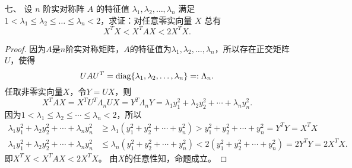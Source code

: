 \begin{enumerate}[1~]
(2) 判断命题 “若$V _ { 1 } \cap V _ { 2 } = \{ 0 \} , V _ { 3 } \cap \left( V _ { 1 } + V _ { 2 } \right) = \{ 0 \}$，则 $V _ { 1 } + V _ { 2 } + V _ { 3 }$ 为直和 ”是否正确，若正确给出证明，若不正确举出反例。

\begin{proof}
(1) 错误。反例： $V_1 = \{\boldsymbol{e}_1\}$，$V_2 = \{\boldsymbol{e}_2\}$，$V_3 = \{\boldsymbol{e}_1 + \boldsymbol{e}_2\}$，其中 $\boldsymbol{e}_1$，$\boldsymbol{e}_2$ 是 $\mathbb{R}^n$ 的两个线性无关的单位向量。

(2) 正确。设 $\Omega_1$ 是生成 $V_1$ 的向量的集合，$\Omega_2$ 是生成 $V_2$ 的向量的集合，$\Omega_3$ 是生成 $V_1$ 的向量的集合。因为 $V _ { 1 } \cap V _ { 2 } = \{ 0 \}$，所以 $V_1 + V_2$ 是直和，所以 $\Omega_1 + \Omega_2$ 是生成 $V_1 + V_2$ 的向量的集合。因为 $V _ { 3 } \cap \left( V _ { 1 } + V _ { 2 } \right) = \{ 0 \}$，所以 $V _ { 3 } + \left( V _ { 1 } + V _ { 2 } \right)$ 是直和，从而 $(\Omega_1 \cup \Omega_2) \cup \Omega_3$ 是线性无关的，所以 $\Omega_1 \cup \Omega_2 \cup \Omega_3$ 是线性无关的，于是 $V_1 + V_2 + V_3$ 是直和。
\end{proof}

\begin{remark}
错解：因为\[
V _ { 1 } \cap V _ { 2 } = \{ 0 \}, V _ { 1 } \cap V _ { 3 } = \{ 0 \}.\]
所以\[
V _ { 1 } \cap (V _ { 2 }+V_{3}) = \{ 0 \}.\]
同理，有\[
V _ { 2 } \cap (V _ { 1 }+V_{3}) = \{ 0 \},\]
\[
V _ { 3 } \cap (V _ { 1 }+V_{2}) = \{ 0 \}.\]
所以$V_1 + V_2 + V_3$ 为直和。\\
错因：$V _ { 1 } \cap \left( V _ { 2 } + V _ { 3 } \right) \supseteq \left( V _ { 1 } \cap V _ { 2 } \right) + \left( V _ { 1 } \cap V _ { 3 } \right)$。
\end{remark}

\item[七、]
设 $n$ 阶实对称阵 $A$ 的特征值 $\lambda _ { 1 } , \lambda _ { 2 } , \dots , \lambda _ { n }$ 满足$1 < \lambda _ { 1 } \leq \lambda _ { 2 } \leq \dots \leq \lambda _ { n } < 2$，求证：对任意零实向量 $X$ 总有\[
X ^ { T } X < X ^ { T } A X < 2 X ^ { T } X.
\]
\begin{proof}
因为$A$是$n$阶实对称矩阵，$A$的特征值为$\lambda_1, \lambda_2, \dots, \lambda_n$，所以存在正交矩阵$U$，使得\[
UAU^T = {\rm diag}\{\lambda_1, \lambda_2, \dots, \lambda_n \} = : \Lambda_n.
\]
任取非零实向量$X$，令$Y = UX$，则\[
X^T AX = X^T U^T \Lambda_n UX = Y^T \Lambda_n Y = \lambda_1 y_1^2 + \lambda_2 y_2^2+ \cdots +\lambda_n y_n^2.
\]
因为$1<\lambda_1 \le \lambda_2 \le \cdots \le \lambda_n<2$，所以\begin{align*}
\lambda_1 y_1^2 + \lambda_2 y_2^2+ \cdots +\lambda_n y_n^2 &\ge  \lambda_1 (y_1^2+y_2^2+\cdots+y_n^2)>y_1^2+y_2^2+\cdots+y_n^2=Y^T Y = X^T X\\
\lambda_1 y_1^2 + \lambda_2 y_2^2+ \cdots +\lambda_n y_n^2 &\le  \lambda_n (y_1^2+y_2^2+\cdots+y_n^2)<2(y_1^2+y_2^2+\cdots+y_n^2)=2Y^T Y = 2X^T X.
\end{align*}
即$X^TX<X^TAX<2X^TX$。
由$X$的任意性知，命题成立。
\end{proof}


\end{enumerate}
